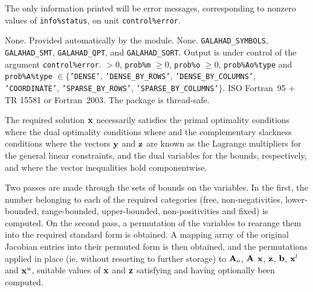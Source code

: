 \documentclass{galahad}
\begin{document}
\galinfo
The only information printed will be error messages, corresponding to 
nonzero values of {\tt info\%status}, on unit {\tt control\%error}. 


\galgeneral

\galcommon None.
\galworkspace Provided automatically by the module.
\galroutines None. 
\galmodules 
{\tt GALAHAD\_SY\-M\-BOLS}, 
{\tt GALAHAD\_SMT}, 
{\tt GALAHAD\_QPT},
and {\tt GALAHAD\_SORT}.
\galio Output is under control of the argument {\tt control\%error}.
 $> 0$, {\tt prob\%m} $\geq  0$, 
 {\tt prob\%o} $\geq  0$, 
 {\tt prob\%Ao\%type} and {\tt prob\%A\%type} $\in \{${\tt 'DENSE'}, 
 {\tt 'DENSE\_BY\_ROWS'},  {\tt 'DENSE\_BY\_COLUMNS'}, 
 {\tt 'COORDINATE'}, {\tt 'SPARSE\_BY\_ROWS'},
 {\tt 'SPARSE\_BY\_COLUMNS'}$\}$. 
\galportability ISO Fortran~95 + TR 15581 or Fortran~2003. 
The package is thread-safe.


\galmethod
The required solution ${\mathbf{x}}$ necessarily satisfies 
the primal optimality conditions
where
the dual optimality conditions
where
and the complementary slackness conditions 
where the vectors ${\mathbf{y}}$ and ${\mathbf{z}}$ are 
known as the Lagrange multipliers for
the general linear constraints, and the dual variables for the bounds,
respectively, and where the vector inequalities hold componentwise.

Two passes are made through the sets of bounds on the variables. 
In the first, the number belonging to each of the required categories 
(free, non-negativities, lower-bounded, range-bounded, 
upper-bounded, non-positivities and fixed) is computed. On the second pass, a 
permutation of the variables to rearange them into the required standard form 
is obtained. A mapping array of the original Jacobian entries into their 
permuted form is then obtained, and the permutations applied in place 
(ie, without resorting to further storage) to ${\mathbf{A}}_o$, ${\mathbf{A}}$ ${\mathbf{x}}$, ${\mathbf{z}}$, 
${\mathbf{b}}$, 
${\mathbf{x}}^l$ and ${\mathbf{x}}^u$, suitable values of ${\mathbf{x}}$ and ${\mathbf{z}}$ 
satisfying  and  having optionally been computed. 
 
\end{document}
